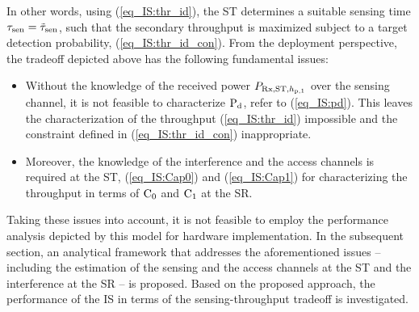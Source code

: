 In other words, using (\ref{eq_IS:thr_id}), the ST determines a suitable sensing time $\tau_{\text{sen}} = \tilde{\tau}_{\text{sen}}$, such that the secondary throughput is maximized subject to a target detection probability,  (\ref{eq_IS:thr_id_con}). From the deployment perspective, the tradeoff depicted above has the following fundamental issues:
\begin{itemize}
\item Without the knowledge of the received power $P_{\text{Rx,ST,$h_{\text{p,1}}$}}$ over the sensing channel, it is not feasible to characterize $\text{P}_{\text{d}}$, refer to (\ref{eq_IS:pd}). This leaves the characterization of the throughput (\ref{eq_IS:thr_id}) impossible and the constraint defined in (\ref{eq_IS:thr_id_con}) inappropriate. 
\item Moreover, the knowledge of the interference and the access channels is required at the ST,  (\ref{eq_IS:Cap0}) and (\ref{eq_IS:Cap1}) for characterizing the throughput in terms of $\text{C}_{\text{0}}$ and $\text{C}_{\text{1}}$ at the SR. 
\end{itemize}
Taking these issues into account, it is not feasible to employ the performance analysis depicted by this model  for hardware implementation. In the subsequent section, an analytical framework  that addresses the aforementioned issues -- including the estimation of the sensing and the access channels at the ST and the interference at the SR -- is proposed. Based on the proposed approach, the performance of the IS in terms of the sensing-throughput tradeoff is investigated. 

\subsection{} \label{ssec_IS:pa}

